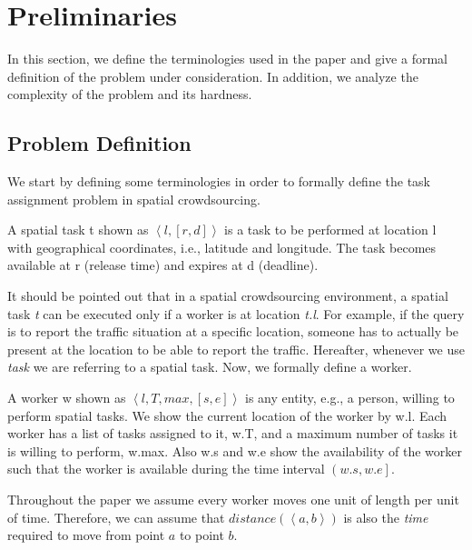 \section{Preliminaries}
\label{sec:prelim}

In this section, we define the terminologies used in the paper and give a formal definition of the problem under consideration. In addition, we analyze the complexity of the problem and its hardness.

\subsection{Problem Definition}
\label{subsec:problemdef}

We start by defining some terminologies in order to formally define the task assignment problem in spatial crowdsourcing.

\begin{definition} 
A spatial task t shown as $\left\langle l, [r, d] \right\rangle$ is a task to be performed at location l with geographical coordinates, i.e., latitude and longitude. The task becomes available at r (release time) and expires at d (deadline).
\end{definition}

It should be pointed out that in a spatial crowdsourcing environment, a spatial task \emph{t} can be executed only if a worker is at location \emph{t.l}. For example, if the query is to report the traffic situation at a specific location, someone has to actually be present at the location to be able to report the traffic. Hereafter, whenever we use \emph{task} we are referring to a spatial task. Now, we formally define a worker.

\begin{definition} [Worker]
A worker w shown as $\left\langle l, T, max, [s, e] \right\rangle$ is any entity, e.g., a person, willing to perform spatial tasks. We show the current location of the worker by w.l. Each worker has a list of tasks assigned to it, w.T, and a maximum number of tasks it is willing to perform, w.max. Also w.s and w.e show the availability of the worker such that the worker is available during the time interval $\left( w.s, w.e \right]$.
\end{definition}

Throughout the paper we assume every worker moves one unit of length per unit of time. Therefore, we can assume that $distance \left( \left\langle a,b \right\rangle \right)$ is also the \emph{time} required to move from point $a$ to point $b$.

